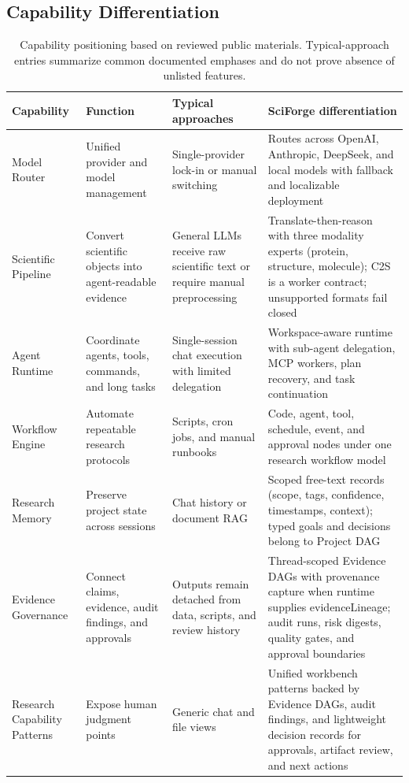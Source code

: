 \documentclass[sn-basic,Numbered,pdflatex]{sn-jnl}
\begin{document}
\clearpage
\begin{appendices}
\renewcommand{\theHtable}{A.\arabic{table}}

\section{Capability Differentiation}

\begin{table}[ht!]
\caption{Capability positioning based on reviewed public materials. Typical-approach entries summarize common documented emphases and do not prove absence of unlisted features.}
\label{tab:capability_differentiation}
\scriptsize
\centering
\setlength{\tabcolsep}{3pt}
\renewcommand{\arraystretch}{1.15}
\begin{tabular}{@{}L{2.2cm} L{2.7cm} L{3.0cm} L{3.5cm}@{}}
\toprule
\textbf{Capability} & \textbf{Function} & \textbf{Typical approaches} & \textbf{SciForge differentiation} \\
\midrule
Model Router
& Unified provider and model management
& Single-provider lock-in or manual switching
& Routes across OpenAI, Anthropic, DeepSeek, and local models with fallback and localizable deployment \\
Scientific Pipeline
& Convert scientific objects into agent-readable evidence
& General LLMs receive raw scientific text or require manual preprocessing
& Translate-then-reason with three modality experts (protein, structure, molecule); C2S is a worker contract; unsupported formats fail closed \\
Agent Runtime
& Coordinate agents, tools, commands, and long tasks
& Single-session chat execution with limited delegation
& Workspace-aware runtime with sub-agent delegation, MCP workers, plan recovery, and task continuation \\
Workflow Engine
& Automate repeatable research protocols
& Scripts, cron jobs, and manual runbooks
& Code, agent, tool, schedule, event, and approval nodes under one research workflow model \\
Research Memory
& Preserve project state across sessions
& Chat history or document RAG
& Scoped free-text records (scope, tags, confidence, timestamps, context); typed goals and decisions belong to Project DAG \\
Evidence Governance
& Connect claims, evidence, audit findings, and approvals
& Outputs remain detached from data, scripts, and review history
& Thread-scoped Evidence DAGs with provenance capture when runtime supplies evidenceLineage; audit runs, risk digests, quality gates, and approval boundaries \\
Research Capability Patterns
& Expose human judgment points
& Generic chat and file views
& Unified workbench patterns backed by Evidence DAGs, audit findings, and lightweight decision records for approvals, artifact review, and next actions \\
\bottomrule
\end{tabular}
\end{table}
\clearpage

\end{appendices}
\end{document}
